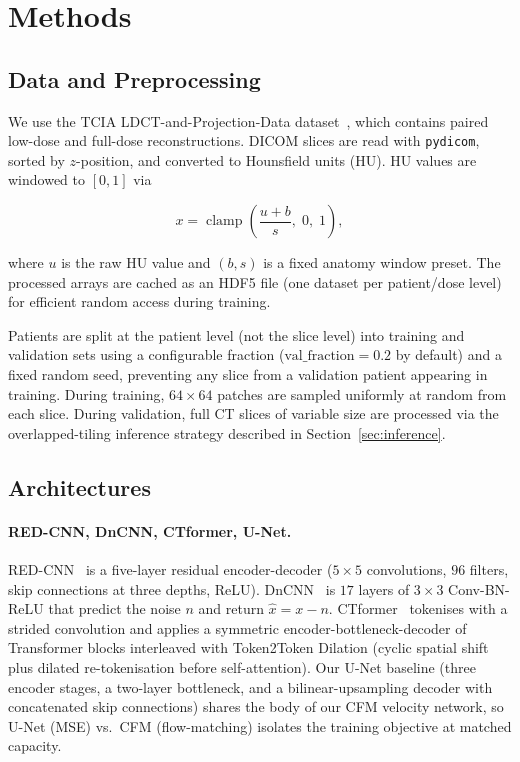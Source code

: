 \documentclass[letterpaper]{article} %
\begin{document}
\section{Methods}

\subsection{Data and Preprocessing}

We use the TCIA LDCT-and-Projection-Data
dataset~\cite{moen2021low}, which contains paired low-dose and full-dose
reconstructions.  DICOM slices are read with \texttt{pydicom}, sorted by
$z$-position, and converted to Hounsfield units (HU).  HU values are
windowed to $[0, 1]$ via

\begin{equation}
  x = \operatorname{clamp}\!\left(\frac{u + b}{s},\; 0,\; 1\right),
  \label{eq:hu-norm}
\end{equation}

where $u$ is the raw HU value and $(b,s)$ is a fixed anatomy window preset.
The processed arrays are cached as an HDF5 file (one dataset per
patient/dose level) for efficient random access during training.

Patients are split at the patient level (not the slice level) into
training and validation sets using a configurable fraction
($\text{val\_fraction}=0.2$ by default) and a fixed random seed, preventing
any slice from a validation patient appearing in training.  During
training, $64\times64$ patches are sampled uniformly at random from each
slice.  During validation, full CT slices of variable size are processed
via the overlapped-tiling inference strategy described in
Section~\ref{sec:inference}.

\subsection{Architectures}

\paragraph{RED-CNN, DnCNN, CTformer, U-Net.}
RED-CNN~\cite{chen2017lowdose} is a five-layer residual encoder-decoder
($5\times5$ convolutions, $96$ filters, skip connections at three depths, ReLU).
DnCNN~\cite{zhang2017beyond} is $17$ layers of $3\times3$ Conv-BN-ReLU that
predict the noise $n$ and return $\hat{x} = x - n$.
CTformer~\cite{wang2022ctformer} tokenises with a strided convolution and applies
a symmetric encoder-bottleneck-decoder of Transformer blocks interleaved with
Token2Token Dilation (cyclic spatial shift plus dilated re-tokenisation before
self-attention).  Our U-Net baseline (three encoder stages, a two-layer
bottleneck, and a bilinear-upsampling decoder with concatenated skip connections)
shares the body of our CFM velocity network, so U-Net (MSE) vs.\ CFM
(flow-matching) isolates the training objective at matched capacity.
\end{document}
